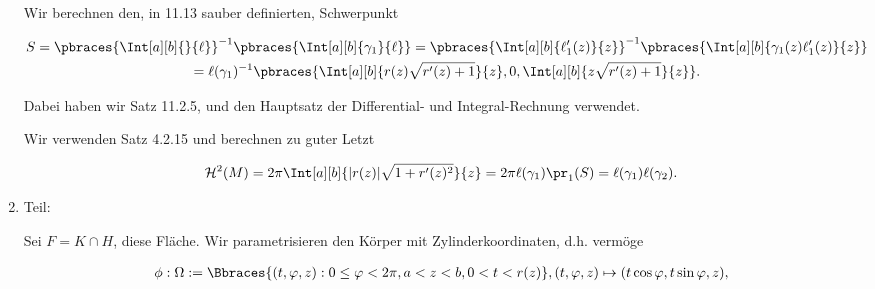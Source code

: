 \begin{solution}
\begin{enumerate}[label = \arabic*.]
\begin{center}
\begin{tcolorbox}[standard jigsaw, opacityback = 0]
        \end{tcolorbox}
    \end{center}
    
    Wir berechnen den, in 11.13 sauber definierten, Schwerpunkt
    
    \begin{multline*}
        S
        =
        \pbraces
        {
            \Int[a][b]{}{\ell}
        }^{-1}
        \pbraces
        {
            \Int[a][b]{\gamma_1}{\ell}
        }
        =
        \pbraces
        {
            \Int[a][b]
            {
                \ell_1^\prime(z)
            }{z}
        }^{-1}
        \pbraces
        {
            \Int[a][b]
            {
                \gamma_1(z)
                \ell_1^\prime(z)
            }{z}
        } \\
        =
        \ell(\gamma_1)^{-1}
        \pbraces
        {
            \Int[a][b]
            {
                r(z)
                \sqrt{r^\prime(z) + 1}
            }{z},
            0,
            \Int[a][b]
            {
                z
                \sqrt{r^\prime(z) + 1}
            }{z}
        }.
    \end{multline*}
    
    
    Dabei haben wir Satz 11.2.5, und den Hauptsatz der Differential- und Integral-Rechnung verwendet.
    
    
    Wir verwenden Satz 4.2.15 und berechnen zu guter Letzt
    
    \begin{align*}
        \mathcal H^2(M)
        =
        2 \pi
        \Int[a][b]
        {
            |r(z)|
            \sqrt{1 + r^\prime(z)^2}
        }{z}
        =
        2 \pi
        \ell(\gamma_1)
        \pr_1(S)
        =
        \ell(\gamma_1)
        \ell(\gamma_2).
    \end{align*}

    \item Teil:
    
    Sei $F = K \cap H$, diese Fläche.
    Wir parametrisieren den Körper mit Zylinderkoordinaten, d.h. vermöge

    \begin{align*}
        \phi:
            \Omega := \Bbraces{(t, \varphi, z): 0 \leq \varphi < 2 \pi, a < z < b, 0 < t < r(z)},
            (t, \varphi, z) \mapsto (t \cos \varphi, t \sin \varphi, z),
    \end{align*}


\end{enumerate}
\end{solution}
